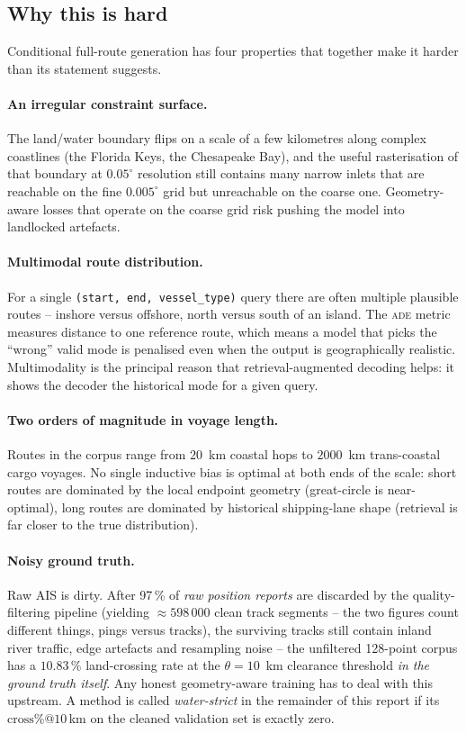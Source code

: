 \documentclass[oneside, a4paper, onecolumn, 11pt]{article}
\newcommand{\ade}{\textsc{ade}}
\begin{document}
\subsection{Why this is hard}\label{sec:hard}

Conditional full-route generation has four properties that together
make it harder than its statement suggests.

\paragraph{An irregular constraint surface.}
The land/water boundary flips on a scale of a few kilometres along
complex coastlines (the Florida Keys, the Chesapeake Bay), and the
useful rasterisation of that boundary at $0.05^\circ$ resolution still
contains many narrow inlets that are reachable on the fine
$0.005^\circ$ grid but unreachable on the coarse one.  Geometry-aware
losses that operate on the coarse grid risk pushing the model into
landlocked artefacts.

\paragraph{Multimodal route distribution.}
For a single \texttt{(start, end, vessel\_type)} query there are often
multiple plausible routes -- inshore versus offshore, north versus
south of an island.  The \ade{} metric measures distance to one
reference route, which means a model that picks the ``wrong'' valid
mode is penalised even when the output is geographically realistic.
Multimodality is the principal reason that retrieval-augmented decoding
helps: it shows the decoder the historical mode for a given query.

\paragraph{Two orders of magnitude in voyage length.}
Routes in the corpus range from $20$~km coastal hops to $2000$~km
trans-coastal cargo voyages.  No single inductive bias is optimal at
both ends of the scale: short routes are dominated by the local
endpoint geometry (great-circle is near-optimal), long routes are
dominated by historical shipping-lane shape (retrieval is far closer
to the true distribution).

\paragraph{Noisy ground truth.}
Raw AIS is dirty.  After 97\,\% of \emph{raw position reports} are
discarded by the quality-filtering pipeline (yielding $\approx 598\,000$
clean track segments -- the two figures count different things, pings
versus tracks), the surviving tracks still contain inland river
traffic, edge artefacts and resampling noise -- the unfiltered
128-point corpus has a $10.83\,\%$ land-crossing rate at the
$\theta = 10$~km clearance threshold \emph{in the ground truth itself}.
Any honest geometry-aware training has to deal with this upstream.
A method is called \emph{water-strict} in the remainder of this report
if its $\mathrm{cross}\%@10\,$km on the cleaned validation set is
exactly zero.
\end{document}
